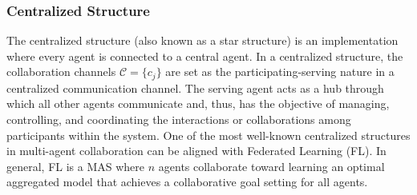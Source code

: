 \documentclass[acmsmall,nonacm]{acmart}
\def\gC{{\mathcal{C}}}
\def\gD{{\mathcal{D}}}
\def\gL{{\mathcal{L}}}
\newcommand{\E}{\mathbb{E}}
\begin{document}
        \subsubsection{Centralized Structure}
        The centralized structure (also known as a star structure) is an implementation where every agent is connected to a central agent. 
        In a centralized structure, the collaboration channels $\gC = \{c_j\}$ are set as the participating-serving nature in a centralized communication channel.
        The serving agent acts as a hub through which all other agents communicate and, thus, has the objective of managing, controlling, and coordinating the interactions or collaborations among participants within the system. 
        One of the most well-known centralized structures in multi-agent collaboration can be aligned with Federated Learning (FL). In general, FL is a MAS where $n$ agents collaborate toward learning an optimal aggregated model that achieves a collaborative goal setting for all agents.
        
\end{document}
